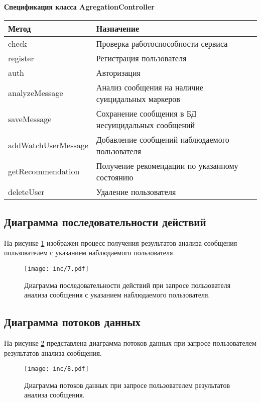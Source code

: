 \textbf{Спецификация класса AgregationController}

\begin{table}[H]
\begin{center}
\begin{tabular}{|C{8cm}|C{8cm}|}
\hline
\textbf{Метод} & \textbf{Назначение} \\ \hline
check & Проверка работоспособности сервиса \\ \hline
register & Регистрация пользователя \\ \hline
auth & Авторизация \\ \hline
analyzeMessage & Анализ сообщения на наличие суицидальных маркеров \\ \hline
saveMessage & Сохранение сообщения в БД несуицидальных сообщений \\ \hline
addWatchUserMessage & Добавление сообщений наблюдаемого пользователя \\ \hline
getRecommendation & Получение рекомендации по указанному состоянию \\ \hline
deleteUser & Удаление пользователя \\ \hline
\end{tabular}
\end{center}
\end{table}

\subsection{Диаграмма последовательности действий}

На рисунке \ref{img:timeline} изображен процесс получения результатов анализа сообщения пользователем с указанием наблюдаемого пользователя.

\begin{figure}[H]
	\centering
	\texttt{[image: inc/7.pdf]}
	\caption{ Диаграмма последовательности действий при запросе пользователя анализа сообщения с указанием наблюдаемого пользователя.}
	\label{img:timeline}
\end{figure}

\subsection{Диаграмма потоков данных}

На рисунке \ref{img:flows} представлена диаграмма потоков данных при запросе пользователем результатов анализа сообщения.

\begin{figure}[H]
	\centering
	\texttt{[image: inc/8.pdf]}
	\caption{ Диаграмма потоков данных при запросе пользователем результатов анализа сообщения.}
	\label{img:flows}
\end{figure}

\pagebreak